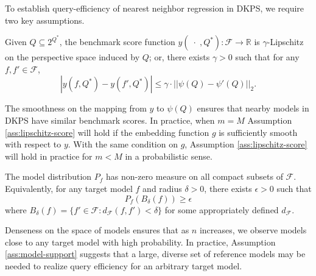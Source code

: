 To establish query-efficiency of nearest neighbor regression in DKPS, we require two key assumptions.
\begin{assumption}
\label{ass:lipschitz-score}
Given $ Q \subseteq 2^{Q^*} $, the benchmark score function $y(\;\cdot\;, Q^{*}): \mathcal{F} \rightarrow \mathbb{R}$ is $\gamma$-Lipschitz on the perspective space induced by $ Q $; or, there exists $ \gamma > 0 $ such that for any $f, f' \in \mathcal{F}$,
$$|y(f, Q^{*}) - y(f', Q^{*})| \leq \gamma \cdot ||\psi(Q) - \psi'(Q)||_2.$$
\end{assumption}
The smoothness on the mapping from $ y $ to $ \psi(Q) $ ensures that nearby models in DKPS have similar benchmark scores.
In practice, when $ m = M $ Assumption \ref{ass:lipschitz-score} will hold if the embedding function $ g $ is sufficiently smooth with respect to $ y $.
With the same condition on $ g $,
Assumption \ref{ass:lipschitz-score} will hold in practice for $ m < M $ in a probabilistic sense.

\begin{assumption}
\label{ass:model-support}
The model distribution $P_f$ has non-zero measure on all compact subsets of $\mathcal{F}$. Equivalently, for any target model $f$ and radius $\delta > 0$, there exists $\epsilon > 0$ such that 
$$P_f(B_\delta(f)) \geq \epsilon$$
where $B_\delta(f) = \{f' \in \mathcal{F}: d_{\mathcal{F}}(f, f') < \delta\}$ for some appropriately defined $ d_{\mathcal{F}} $.
\end{assumption}
Denseness on the space of models ensures that as $n$ increases, we observe models close to any target model with high probability.
In practice, Assumption \ref{ass:model-support} suggests that a large, diverse set of reference models may be needed to realize query efficiency for an arbitrary target model.

